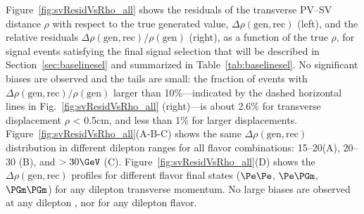 Figure~\ref{fig:svResidVsRho_all} shows the residuals of the
transverse PV--SV distance $\rho$ with respect to the true generated
value, $\Delta\rho(\mathrm{gen,rec})$ (left), and the relative residuals
$\Delta\rho(\mathrm{gen,rec})/\rho(\mathrm{gen})$ (right), as a
function of the true $\rho$, for signal events satisfying the final
signal selection that will be described in
Section~\ref{sec:baselinesel} and summarized in
Table~\ref{tab:baselinesel}. No significant biases are observed and
the tails are small: the fraction of events with
$\Delta\rho(\mathrm{gen,rec})/\rho(\mathrm{gen})$ larger than
10\%---indicated by the dashed horizontal lines in
Fig.~\ref{fig:svResidVsRho_all} (right)---is about 2.6\% for
transverse displacement $\rho$ < 0.5cm, and less than 1\% for larger
displacements.
Figure~\ref{fig:svResidVsRho_all}(A-B-C) shows the same
$\Delta\rho(\mathrm{gen,rec})$ distribution in different dilepton \pt
ranges for all flavor combinations: 15--20\GeV (A), 20--30\GeV
(B), and $>30\GeV$ (C).
Figure~\ref{fig:svResidVsRho_all}(D) shows the
$\Delta\rho(\mathrm{gen,rec})$ profiles for different flavor final
states ($\Pe\Pe$, $\Pe\PGm$, $\PGm\PGm$) for any dilepton transverse
momentum.
No large biases are observed at any dilepton \pt, nor for
any dilepton flavor.
